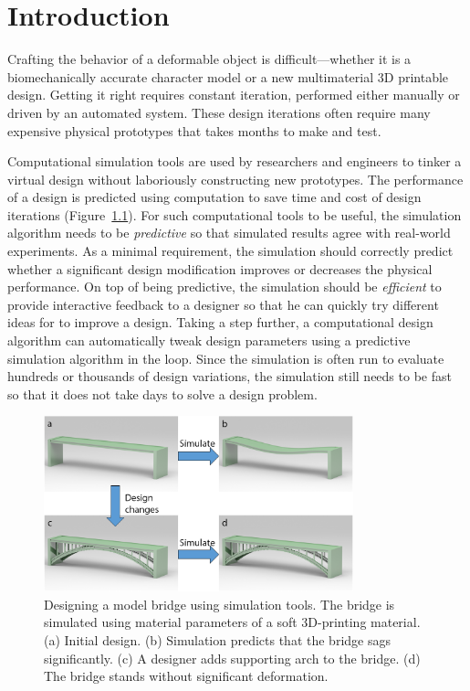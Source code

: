 \chapter{Introduction}
Crafting the behavior of a deformable object is difficult---whether it is a biomechanically accurate character model or a new multimaterial
3D printable design.
Getting it right requires constant iteration, performed either manually or driven by an automated system.
These design iterations often require many expensive physical prototypes that takes months to make and test.

Computational simulation tools are used by researchers and engineers to tinker a virtual design without laboriously constructing new prototypes.
The performance of a design is predicted using computation to save time and cost of design iterations (Figure~\ref{fig:bridgeDesign}).
For such computational tools to be useful, the simulation algorithm needs to be \textit{predictive} so that simulated results agree with real-world experiments.
As a minimal requirement, the simulation should correctly predict whether a significant design modification improves or decreases the physical performance.
On top of being predictive, the simulation should be \textit{efficient} to provide interactive feedback to a designer so that he can quickly try different ideas for to improve a design.
Taking a step further, a computational design algorithm can automatically tweak design parameters using a predictive simulation algorithm in the loop.
Since the simulation is often run to evaluate hundreds or thousands of design variations, the simulation still needs to be fast so that it does not take days to solve a design problem.
\begin{figure}
	\centering
	\includegraphics[width=0.8\textwidth]{images/bridgeDesign.png}
	\caption{Designing a model bridge using simulation tools.
		The bridge is simulated using material parameters of a soft 3D-printing material. (a) Initial design.
		(b) Simulation predicts that the bridge sags significantly.
		(c) A designer adds supporting arch to the bridge.
		(d) The bridge stands without significant deformation.}
	\label{fig:bridgeDesign}
\end{figure}
